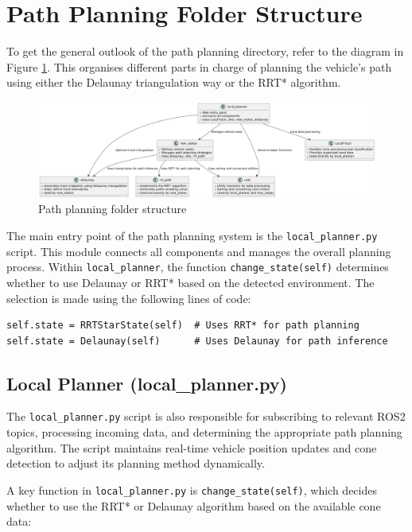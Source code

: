 \documentclass[a4paper,11pt]{report}
\begin{document}
\section{Path Planning Folder Structure}

To get the general outlook of the path planning directory, refer to the diagram in Figure
\ref{fig:path_planning_structure}. This organises different parts in charge of planning
the vehicle's path using either the Delaunay triangulation way or the RRT* algorithm.

\begin{figure}[h]
    \centering
    \includegraphics[width=\textwidth]{Images/local_planner.png}
    \caption{Path planning folder structure}
    \label{fig:path_planning_structure}
\end{figure}

The main entry point of the path planning system is the \texttt{local\_planner.py} script. This module connects all components and manages the overall planning process. 
Within \texttt{local\_planner}, the function \texttt{change\_state(self)} determines whether to use Delaunay or RRT* based on the detected environment. 
The selection is made using the following lines of code:

\begin{verbatim}
self.state = RRTStarState(self)  # Uses RRT* for path planning
self.state = Delaunay(self)      # Uses Delaunay for path inference
\end{verbatim}

\subsection{Local Planner (local\_planner.py)}
The \texttt{local\_planner.py} script is also responsible for subscribing to relevant ROS2 topics, processing incoming data, 
and determining the appropriate path planning algorithm. The script maintains real-time vehicle position 
updates and cone detection to adjust its planning method dynamically.

A key function in \texttt{local\_planner.py} is \texttt{change\_state(self)}, which decides whether to use the RRT* or Delaunay algorithm based on the available cone data:
\end{document}
